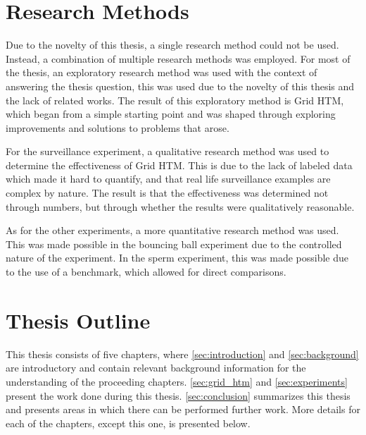 \section{Research Methods}
Due to the novelty of this thesis, a single research method could not be used. Instead, a combination of multiple research methods was employed. For most of the thesis, an exploratory research method was used with the context of answering the thesis question, this was used due to the novelty of this thesis and the lack of related works. The result of this exploratory method is Grid HTM, which began from a simple starting point and was shaped through exploring improvements and solutions to problems that arose.
\par
For the surveillance experiment, a qualitative research method was used to determine the effectiveness of Grid HTM. This is due to the lack of labeled data which made it hard to quantify, and that real life surveillance examples are complex by nature. The result is that the effectiveness was determined not through numbers, but through whether the results were qualitatively reasonable.
\par
As for the other experiments, a more quantitative research method was used. This was made possible in the bouncing ball experiment due to the controlled nature of the experiment. In the sperm experiment, this was made possible due to the use of a benchmark, which allowed for direct comparisons.
\section{Thesis Outline}
This thesis consists of five chapters, where \autoref{sec:introduction} and \autoref{sec:background} are introductory and contain relevant background information for the understanding of the proceeding chapters. \autoref{sec:grid_htm} and \autoref{sec:experiments} present the work done during this thesis. \autoref{sec:conclusion} summarizes this thesis and presents areas in which there can be performed further work. More details for each of the chapters, except this one, is presented below.
\par
